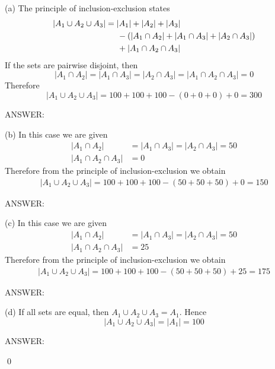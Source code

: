 (a) The principle of inclusion-exclusion states
\begin{align*}
|A_1 \cup A_2 \cup A_3|
&= |A_1| + |A_2| + |A_3| \\
& \hspace{0.5cm} 
- \left( |A_1 \cap A_2| + |A_1 \cap A_3| + |A_2 \cap A_3| \right) \\
& \hspace{0.5cm} + |A_1 \cap A_2 \cap A_3|
\end{align*}
If the sets are pairwise disjoint, then
\[
|A_1 \cap A_2| = |A_1 \cap A_3| = |A_2 \cap A_3| =
|A_1 \cap A_2 \cap A_3| = 0
\]
Therefore
\[
|A_1 \cup A_2 \cup A_3|
= 100 + 100 + 100 - (0 + 0 + 0) + 0 = 300
\]

ANSWER:


(b)
In this case we are given
\begin{align*}
|A_1 \cap A_2| &= |A_1 \cap A_3| = |A_2 \cap A_3| = 50 \\
|A_1 \cap A_2 \cap A_3| &= 0 
\end{align*}
Therefore from the principle of inclusion-exclusion we obtain
\begin{align*}
|A_1 \cup A_2 \cup A_3|
= 100 + 100 + 100 - (50 + 50 + 50) + 0 = 150
\end{align*}

ANSWER:


(c)
In this case we are given
\begin{align*}
|A_1 \cap A_2| &= |A_1 \cap A_3| = |A_2 \cap A_3| = 50 \\
|A_1 \cap A_2 \cap A_3| &= 25 
\end{align*}
Therefore from the principle of inclusion-exclusion we obtain
\begin{align*}
|A_1 \cup A_2 \cup A_3|
= 100 + 100 + 100 - (50 + 50 + 50) + 25 = 175
\end{align*}

ANSWER:


(d) If all sets are equal, then $A_1 \cup A_2 \cup A_3 = A_1$.
Hence
\[
|A_1 \cup A_2 \cup A_3| = |A_1| = 100
\]

ANSWER:

\qed
